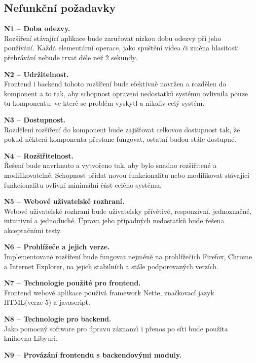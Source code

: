 \documentclass[thesis=M,czech]{FITthesis}[2012/06/26]
\begin{document}
\subsection{Nefunkční požadavky} \label{subsec:analyza_np}
  \begin{description}
    \item \textbf{N1 -- Doba odezvy.\\}
    Rozšíření stávající aplikace bude zaručovat nízkou dobu odezvy při jeho používání. Každá elementární operace, jako spuštění videa či změna hlasitosti přehrávání nebude trvat déle než 2 sekundy.
    \item \textbf{N2 -- Udržitelnost.\\}
	Frontend i backend tohoto rozšíření bude efektivně navržen a rozdělen do komponent a to tak, aby schopnost opravení nedostatků systému ovlivnila pouze tu komponentu, ve které se problém vyskytl a nikoliv celý systém.
    \item \textbf{N3 -- Dostupnost.\\}
	Rozdělení rozšíření do komponent bude zajišťovat celkovou dostupnost tak, že pokud některá komponenta přestane fungovat, ostatní budou stále dostupné.
    \item \textbf{N4 -- Rozšiřitelnost.\\}
	Řešení bude navrhnuto a vytvořeno tak, aby bylo snadno rozšiřitené a modifikovatelné. Schopnost přidat novou funkcionalitu nebo modifikovat stávající funkcionalitu ovlivní minimální část celého systému.
    \item \textbf{N5 -- Webové uživatelské rozhraní.\\}
	Webové uživatelské rozhraní bude uživatelsky přívětivé, responzivní, jednoznačné, intuitivní a jednoduché. Úprava jeho případných nedostatků bude řešena akceptačními testy.
    \item \textbf{N6 -- Prohlížeče a jejich verze.\\}
	Implementované rozšíření bude fungovat nejméně na prohlížečích Firefox, Chrome a Internet Explorer, na jejich stabilních a stále podporovaných verzích.
    \item \textbf{N7 -- Technologie použité pro frontend.\\}
	Frontend webové aplikace používá framework Nette, značkovací jazyk HTML(verze 5) a javascript.
    \item \textbf{N8 -- Technologie pro backend.\\}
	Jako pomocný software pro úpravu záznamů i přenos po síti bude použita knihovna Libyuri.
    \item \textbf{N9 -- Provázání frontendu s backendovými moduly.\\}

\end{description}
\end{document}
